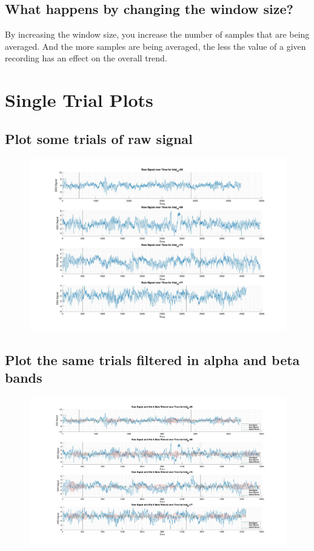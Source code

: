 \documentclass[12pt]{article}
\begin{document}
\subsection{What happens by changing the window size?}
By increasing the window size, you increase the number of samples that are being averaged. And the more samples are being averaged, the less the value of a given recording has an effect on the overall trend.\clearpage

\section{Single Trial Plots}
\subsection{Plot some trials of raw signal}
\begin{figure}[!htb]
    \includegraphics[scale=0.3, center]{raw_trials}
\end{figure}\clearpage

\subsection{Plot the same trials filtered in alpha and beta bands}
\begin{figure}[!htb]
    \includegraphics[scale=0.28, center]{alpha_beta_trials}
\end{figure}\clearpage
\end{document}

